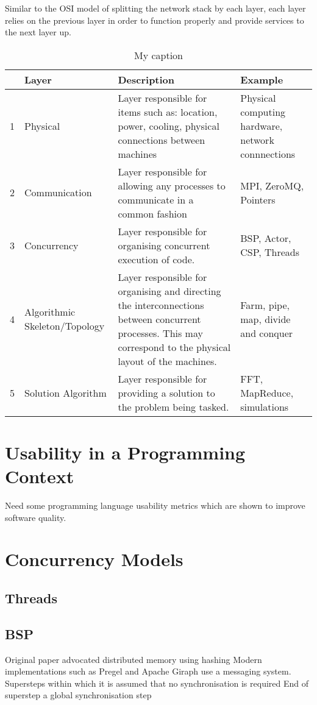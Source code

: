 \documentclass{sig-alternate}
\begin{document}
Similar to the OSI model of splitting the network stack by each layer, each layer relies on the previous layer in order to function properly and provide services to the next layer up.

\begin{table}[]
\centering
\caption{My caption}
\label{my-label}
\begin{tabular}{llll}
 & Layer & Description & Example \\ \hline
1 & Physical & Layer responsible for items such as: location, power, cooling, physical connections between machines & Physical computing hardware, network connnections \\
2 & Communication & Layer responsible for allowing any processes to communicate in a common fashion & MPI, ZeroMQ, Pointers \\
3 & Concurrency & Layer responsible for organising concurrent execution of code. & BSP, Actor, CSP, Threads \\
4 & Algorithmic Skeleton/Topology & Layer responsible for organising and directing the interconnections between concurrent processes. This may correspond to the physical layout of the machines. & Farm, pipe, map, divide and conquer\\
5 & Solution Algorithm & Layer responsible for providing a solution to the problem being tasked. & FFT, MapReduce, simulations
\end{tabular}
\end{table}

\section{Usability in a Programming Context}
Need some programming language usability metrics which are shown to improve software quality.

\section{Concurrency Models}
\subsection{Threads}


\subsection{BSP}
Original paper advocated distributed memory using hashing
Modern implementations such as Pregel and Apache Giraph use a messaging system.
Supersteps within which it is assumed that no synchronisation is required
End of superstep a global synchronisation step
\end{document}
